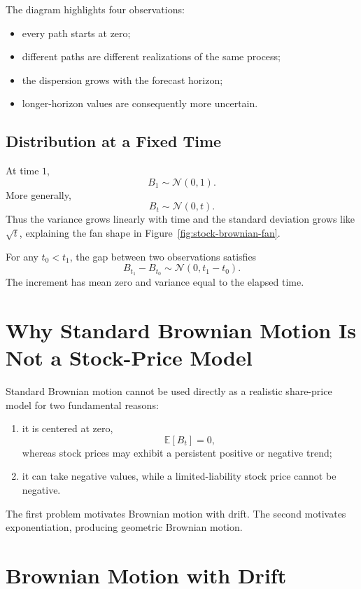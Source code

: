 \documentclass[12pt,openany]{book}
\theoremstyle{definition}
\theoremstyle{remark}
\newcommand{\E}{\mathbb{E}}
\begin{document}
The diagram highlights four observations:
\begin{itemize}
    \item every path starts at zero;
    \item different paths are different realizations of the same process;
    \item the dispersion grows with the forecast horizon;
    \item longer-horizon values are consequently more uncertain.
\end{itemize}

\subsection{Distribution at a Fixed Time}

At time \(1\),
\[
B_1\sim\mathcal{N}(0,1).
\]
More generally,
\[
\boxed{B_t\sim\mathcal{N}(0,t).}
\]
Thus the variance grows linearly with time and the standard deviation grows
like \(\sqrt{t}\), explaining the fan shape in
Figure~\ref{fig:stock-brownian-fan}.

For any \(t_0<t_1\), the gap between two observations satisfies
\[
\boxed{
B_{t_1}-B_{t_0}
\sim\mathcal{N}(0,t_1-t_0).
}
\]
The increment has mean zero and variance equal to the elapsed time.

\section{Why Standard Brownian Motion Is Not a Stock-Price Model}

Standard Brownian motion cannot be used directly as a realistic share-price
model for two fundamental reasons:
\begin{enumerate}
    \item it is centered at zero,
    \[
    \E[B_t]=0,
    \]
    whereas stock prices may exhibit a persistent positive or negative
    trend;
    \item it can take negative values, while a limited-liability stock price
    cannot be negative.
\end{enumerate}

The first problem motivates Brownian motion with drift. The second motivates
exponentiation, producing geometric Brownian motion.

\section{Brownian Motion with Drift}
\end{document}
